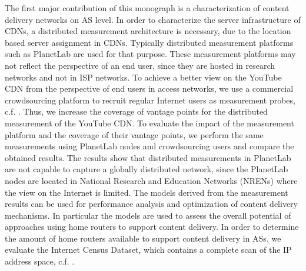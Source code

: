 

The first major contribution of this monograph is a characterization of content delivery networks on AS level.
In order to characterize the server infrastructure of CDNs, a distributed measurement architecture is necessary, due to the location based server assignment in CDNs.
Typically distributed measurement platforms such as PlanetLab are used for that purpose.
These measurement platforms may not reflect the perspective of an end user, since they are hosted in research networks and not in ISP networks.
To achieve a better view on the YouTube CDN from the perspective of end users in access networks, we use a commercial crowdsourcing platform to recruit regular Internet users as measurement probes, c.f. \cite{burger2014vantage}.
Thus, we increase the coverage of vantage points for the distributed measurement of the YouTube CDN.
To evaluate the impact of the measurement platform and the coverage of their vantage points, we perform the same measurements using PlanetLab nodes and crowdsourcing users and compare the obtained results.
The results show that distributed measurements in PlanetLab are not capable to capture a globally distributed network, since the PlanetLab nodes are located in National Research and Education Networks (NRENs) where the view on the Internet is limited.
The models derived from the measurement results can be used for performance analysis and optimization of content delivery mechanisms.
In particular the models are used to assess the overall potential of approaches using home routers to support content delivery.
In order to determine the amount of home routers available to support content delivery in ASs, we evaluate the Internet Census Dataset, which contains a complete scan of the IP address space, c.f. \cite{burger2016hierarchical}.
